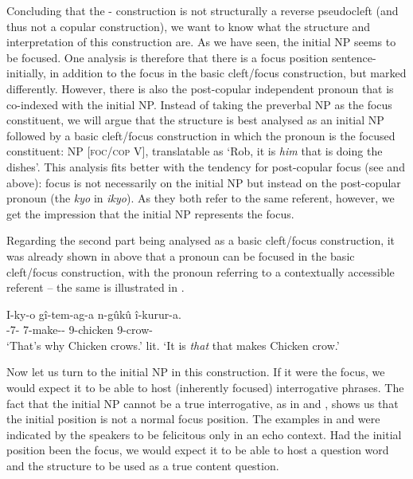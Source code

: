 \documentclass[output=paper]{langscibook}
\begin{document}
Concluding that the \NI-\PRO{} construction is not structurally a reverse pseudocleft (and thus not a copular construction), we want to know what the structure and interpretation of this construction are. As we have seen, the initial NP seems to be focused. One analysis is therefore that there is a focus position sentence-initially, in addition to the focus in the basic cleft/focus construction, but marked differently. However, there is also the post-copular independent pronoun that is co-indexed with the initial NP. Instead of taking the preverbal NP as the focus constituent, we will argue that the structure is best analysed as an initial NP followed by a basic cleft/focus construction in which the pronoun is the focused constituent: NP [\textsc{foc/cop} \PRO{} V], translatable as ‘Rob, it is \textit{him} that is doing the dishes’. This analysis fits better with the tendency for post-copular focus (see  and  above): focus is not necessarily on the initial NP but instead on the post-copular pronoun (the \textit{kyo} in \textit{ikyo}). As they both refer to the same referent, however, we get the impression that the initial NP represents the focus.

Regarding the second part being analysed as a basic cleft/focus construction, it was already shown in  above that a pronoun can be focused in the basic cleft/focus construction, with the pronoun referring to a contextually accessible referent – the same is illustrated in .

\ea
\label{bkm:Ref111724336}
\gll
I-ky-o  gî-tem-ag-a  n-gûkû    î-kurur-a.\\
\COP{}-7-\PRO{} 7\SM{}-make-\HAB-\FV{} 9-chicken  9\SM{}-crow-\FV{}\\
\glt
‘That’s why Chicken crows.’
lit. ‘It is {\itshape that} that makes Chicken crow.’

\z
\largerpage


Now let us turn to the initial NP in this construction. If it were the focus, we would expect it to be able to host (inherently focused) interrogative phrases. The fact that the initial NP cannot be a true interrogative, as in  and , shows us that the initial position is not a normal focus position. The examples in  and  were indicated by the speakers to be felicitous only in an echo context. Had the initial position been the focus, we would expect it to be able to host a question word and the structure to be used as a true content question.
\end{document}
